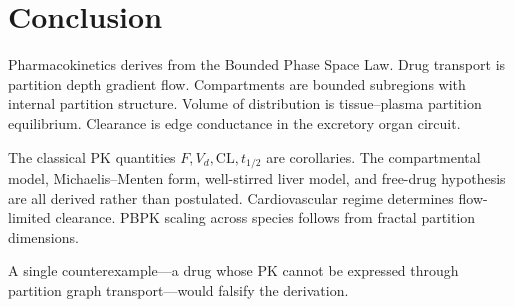 \documentclass[twocolumn,10pt,a4paper]{article}
\theoremstyle{definition}
\theoremstyle{remark}
\begin{document}
\section{Conclusion}

Pharmacokinetics derives from the Bounded Phase Space Law. Drug transport is partition depth gradient flow. Compartments are bounded subregions with internal partition structure. Volume of distribution is tissue--plasma partition equilibrium. Clearance is edge conductance in the excretory organ circuit.

The classical PK quantities $F, V_d, \mathrm{CL}, t_{1/2}$ are corollaries. The compartmental model, Michaelis--Menten form, well-stirred liver model, and free-drug hypothesis are all derived rather than postulated. Cardiovascular regime determines flow-limited clearance. PBPK scaling across species follows from fractal partition dimensions.

A single counterexample---a drug whose PK cannot be expressed through partition graph transport---would falsify the derivation.



\end{document}
